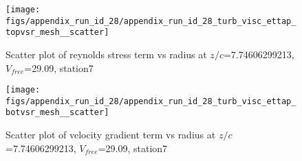 \begin{figure}[H]
\centering
\texttt{[image: figs/appendix\_run\_id\_28/appendix\_run\_id\_28\_turb\_visc\_ettap\_topvsr\_mesh\_\_scatter]}
\caption{Scatter plot of reynolds stress term vs radius at $z/c$=7.74606299213, $V_{free}$=29.09, station7}
\label{fig:appendix_run_id_28_turb_visc_ettap_topvsr_mesh__scatter}
\end{figure}


\begin{figure}[H]
\centering
\texttt{[image: figs/appendix\_run\_id\_28/appendix\_run\_id\_28\_turb\_visc\_ettap\_botvsr\_mesh\_\_scatter]}
\caption{Scatter plot of velocity gradient term vs radius at $z/c$=7.74606299213, $V_{free}$=29.09, station7}
\label{fig:appendix_run_id_28_turb_visc_ettap_botvsr_mesh__scatter}
\end{figure}


